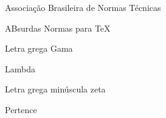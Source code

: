 \documentclass[
	12pt,				%
	openright,			%
	oneside,			%
	a4paper,			%
	brazil				%
	]{abntex2}
\begin{document}
\frenchspacing 

\imprimircapa
\imprimirfolhaderosto*








\tableofcontents*
\cleardoublepage
\listoffigures*
\cleardoublepage
\listoftables*
\cleardoublepage
\begin{siglas}
  \item[ABNT] Associação Brasileira de Normas Técnicas
  \item[abnTeX] ABsurdas Normas para TeX
\end{siglas}
\begin{simbolos}
  \item[$ \Gamma $] Letra grega Gama
  \item[$ \Lambda $] Lambda
  \item[$ \zeta $] Letra grega minúscula zeta
  \item[$ \in $] Pertence
\end{simbolos}




\textual








\postextual







\printindex
\end{document}
